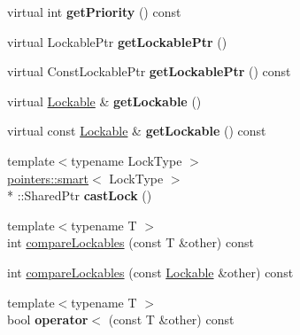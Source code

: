 \begin{DoxyCompactItemize}
\item 
\hypertarget{classcore_1_1threading_1_1_lockable_a891e7d6e8c9d55a9afa2ef83e3d807c5}{virtual int {\bfseries get\-Priority} () const }\label{classcore_1_1threading_1_1_lockable_a891e7d6e8c9d55a9afa2ef83e3d807c5}

\item 
\hypertarget{classcore_1_1threading_1_1_lockable_a60e7b7a71c0fb390cb74cdab738a59d2}{virtual Lockable\-Ptr {\bfseries get\-Lockable\-Ptr} ()}\label{classcore_1_1threading_1_1_lockable_a60e7b7a71c0fb390cb74cdab738a59d2}

\item 
\hypertarget{classcore_1_1threading_1_1_lockable_aa585f68f6488aad1a47191b49d1d9222}{virtual Const\-Lockable\-Ptr {\bfseries get\-Lockable\-Ptr} () const }\label{classcore_1_1threading_1_1_lockable_aa585f68f6488aad1a47191b49d1d9222}

\item 
\hypertarget{classcore_1_1threading_1_1_lockable_ad9f77c5b9c78f0f16f429eb04a0da573}{virtual \hyperlink{classcore_1_1threading_1_1_lockable}{Lockable} \& {\bfseries get\-Lockable} ()}\label{classcore_1_1threading_1_1_lockable_ad9f77c5b9c78f0f16f429eb04a0da573}

\item 
\hypertarget{classcore_1_1threading_1_1_lockable_a2fcd49537a849815bc8498e7f2b8f240}{virtual const \hyperlink{classcore_1_1threading_1_1_lockable}{Lockable} \& {\bfseries get\-Lockable} () const }\label{classcore_1_1threading_1_1_lockable_a2fcd49537a849815bc8498e7f2b8f240}

\item 
\hypertarget{classcore_1_1threading_1_1_lockable_ab74f89144d345c1adaaa4425bfdd2247}{{\footnotesize template$<$typename Lock\-Type $>$ }\\\hyperlink{structcore_1_1pointers_1_1smart}{pointers\-::smart}$<$ Lock\-Type $>$\\*
\-::Shared\-Ptr {\bfseries cast\-Lock} ()}\label{classcore_1_1threading_1_1_lockable_ab74f89144d345c1adaaa4425bfdd2247}

\item 
{\footnotesize template$<$typename T $>$ }\\int \hyperlink{classcore_1_1threading_1_1_lockable_a1c5c202187fe528a7be37920b1bc94ba}{compare\-Lockables} (const T \&other) const 
\item 
int \hyperlink{classcore_1_1threading_1_1_lockable_ac31c612e403fb7c6db340322ddbaf2df}{compare\-Lockables} (const \hyperlink{classcore_1_1threading_1_1_lockable}{Lockable} \&other) const 
\item 
\hypertarget{classcore_1_1threading_1_1_lockable_afc937b17bd1498b44efe1fadeb8424eb}{{\footnotesize template$<$typename T $>$ }\\bool {\bfseries operator$<$} (const T \&other) const }\label{classcore_1_1threading_1_1_lockable_afc937b17bd1498b44efe1fadeb8424eb}


\end{DoxyCompactItemize}
